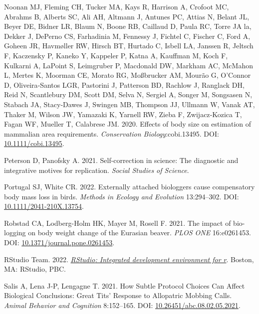 \documentclass[10pt,a4paper]{article}
\newlength{\cslhangindent}
\newlength{\cslentryspacingunit} %
\newenvironment{CSLReferences}[2] %
 {%
  \setlength{\parindent}{0pt}
  \ifodd #1
  \let\oldpar\par
  \def\par{\hangindent=\cslhangindent\oldpar}
  \fi
  \setlength{\parskip}{#2\cslentryspacingunit}
 }%
 {}
\begin{document}
\begin{CSLReferences}{1}{0}
\leavevmode{}%
Noonan MJ, Fleming CH, Tucker MA, Kays R, Harrison A, Crofoot MC, Abrahms B, Alberts SC, Ali AH, Altmann J, Antunes PC, Attias N, Belant JL, Beyer DE, Bidner LR, Blaum N, Boone RB, Caillaud D, Paula RC, Torre JA la, Dekker J, DePerno CS, Farhadinia M, Fennessy J, Fichtel C, Fischer C, Ford A, Goheen JR, Havmøller RW, Hirsch BT, Hurtado C, Isbell LA, Janssen R, Jeltsch F, Kaczensky P, Kaneko Y, Kappeler P, Katna A, Kauffman M, Koch F, Kulkarni A, LaPoint S, Leimgruber P, Macdonald DW, Markham AC, McMahon L, Mertes K, Moorman CE, Morato RG, Moßbrucker AM, Mourão G, O'Connor D, Oliveira‐Santos LGR, Pastorini J, Patterson BD, Rachlow J, Ranglack DH, Reid N, Scantlebury DM, Scott DM, Selva N, Sergiel A, Songer M, Songsasen N, Stabach JA, Stacy‐Dawes J, Swingen MB, Thompson JJ, Ullmann W, Vanak AT, Thaker M, Wilson JW, Yamazaki K, Yarnell RW, Zieba F, Zwijacz‐Kozica T, Fagan WF, Mueller T, Calabrese JM. 2020. Effects of body size on estimation of mammalian area requirements. \emph{Conservation Biology}:cobi.13495. DOI: \href{https://doi.org/10.1111/cobi.13495}{10.1111/cobi.13495}.

\leavevmode{}%
Peterson D, Panofsky A. 2021. Self-correction in science: {The} diagnostic and integrative motives for replication. \emph{Social Studies of Science}.

\leavevmode{}%
Portugal SJ, White CR. 2022. Externally attached biologgers cause compensatory body mass loss in birds. \emph{Methods in Ecology and Evolution} 13:294--302. DOI: \href{https://doi.org/10.1111/2041-210X.13754}{10.1111/2041-210X.13754}.

\leavevmode{}%
Robstad CA, Lodberg-Holm HK, Mayer M, Rosell F. 2021. The impact of bio-logging on body weight change of the {Eurasian} beaver. \emph{PLOS ONE} 16:e0261453. DOI: \href{https://doi.org/10.1371/journal.pone.0261453}{10.1371/journal.pone.0261453}.

\leavevmode{}%
RStudio Team. 2022. \emph{\href{http://www.rstudio.com/}{{RStudio}: Integrated development environment for r}}. Boston, MA: RStudio, PBC.

\leavevmode{}%
Salis A, Lena J-P, Lengagne T. 2021. How {Subtle} {Protocol} {Choices} {Can} {Affect} {Biological} {Conclusions}: {Great} {Tits}' {Response} to {Allopatric} {Mobbing} {Calls}. \emph{Animal Behavior and Cognition} 8:152--165. DOI: \href{https://doi.org/10.26451/abc.08.02.05.2021}{10.26451/abc.08.02.05.2021}.


\end{CSLReferences}
\end{document}
